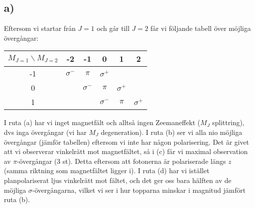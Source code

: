 \subsection{a)}
Eftersom vi startar från $J=1$ och går till $J=2$ får vi följande
tabell över möjliga övergångar:
\begin{table}[H]
    \begin{tabular}{c | c c c c c}
        $ M_{J=1} \backslash M_{J=2}$ & -2 & -1 & 0 & 1 & 2 \\
        \hline
        -1  &$\sigma^-$&$\pi$&$\sigma^+$& & \\
        0   & & $\sigma^-$&$\pi$&$\sigma^+$& \\
        1   & & & $\sigma^-$&$\pi$&$\sigma^+$ 
    \end{tabular}
\end{table}
I ruta (a) har vi inget magnetfält och alltså ingen Zeemaneffekt ($M_J$ splittring), dvs inga övergångar (vi har $M_J$ degeneration). 
I ruta (b) ser vi alla nio möjliga övergångar (jämför tabellen) eftersom vi inte har någon polarisering.
Det är givet att vi observerar vinkelrätt mot magnetfältet, så i (c) får vi maximal observation av $\pi$-övergångar (3 st). 
Detta eftersom att fotonerna är polariserade längs $z$ (samma riktning som magnetfältet ligger i). I ruta (d) har vi istället planpolariserat ljus
vinkelrätt mot fältet, och det ger oss bara hälften av de möjliga $\sigma$-övergångarna, vilket vi ser i hur topparna minskar i magnitud jämfört ruta (b).

